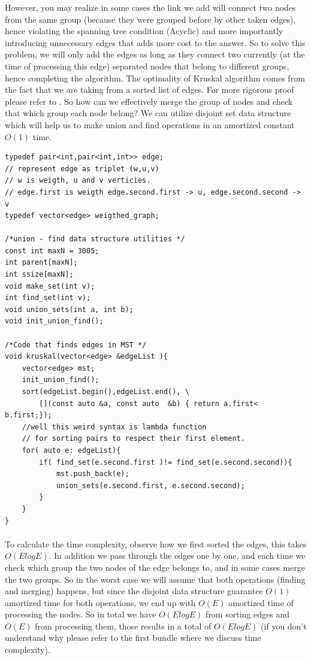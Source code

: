\documentclass[12pt]{article}
\begin{document}
However, you may realize in some cases the link we add will connect two nodes from the same group (because they were grouped before by other taken edges), hence violating the spanning tree condition (Acyclic) and more importantly introducing unnecessary edges that adds more cost to the answer. So to solve this problem, we will only add the edges as long as they connect two currently (at the time of processing this edge) separated nodes that belong to different groups, hence completing the algorithm.
\newline\newline
The optimality of Kruskal algorithm comes from the fact that we are taking from a sorted list of edges. For more rigorous proof please refer to \cite{11}.
\newline\newline
So how can we effectively merge the group of nodes and check that which group each node belong? We can utilize disjoint set data structure which will help us to make union and find operations in an amortized constant $O(1)$ time. 
\begin{verbatim}
typedef pair<int,pair<int,int>> edge;
// represent edge as triplet (w,u,v)
// w is weigth, u and v verticies.
// edge.first is weigth edge.second.first -> u, edge.second.second -> v
typedef vector<edge> weigthed_graph;

/*union - find data structure utilities */
const int maxN = 3005;
int parent[maxN];
int ssize[maxN];
void make_set(int v);
int find_set(int v);
void union_sets(int a, int b);
void init_union_find();

/*Code that finds edges in MST */
void kruskal(vector<edge> &edgeList ){
    vector<edge> mst;
    init_union_find();
    sort(edgeList.begin(),edgeList.end(), \
        [](const auto &a, const auto  &b) { return a.first< b.first;}); 
    //well this weird syntax is lambda function 
    // for sorting pairs to respect their first element.
    for( auto e: edgeList){
        if( find_set(e.second.first )!= find_set(e.second.second)){
            mst.push_back(e);
            union_sets(e.second.first, e.second.second);
        }
    }
}
\end{verbatim}

\paragraph{}
To calculate the time complexity, observe how we first sorted the edges, this takes $O(E log E)$. In addition we pass through the edges one by one, and each time we check which group the two nodes of the edge belongs to, and in some cases merge the two groups. So in the worst case we will assume that both operations (finding and merging) happens, but since the disjoint data structure guarantee $O(1)$ amortized time for both operations, we end up with $O(E)$ amortized time of processing the nodes.
\newline\newline
So in total we have $O(E log E)$ from sorting edges and $O(E)$ from processing them, those results in a total of $O(E log E)$ (if you don't understand why please refer to the first bundle where we discuss time complexity).
\end{document}
